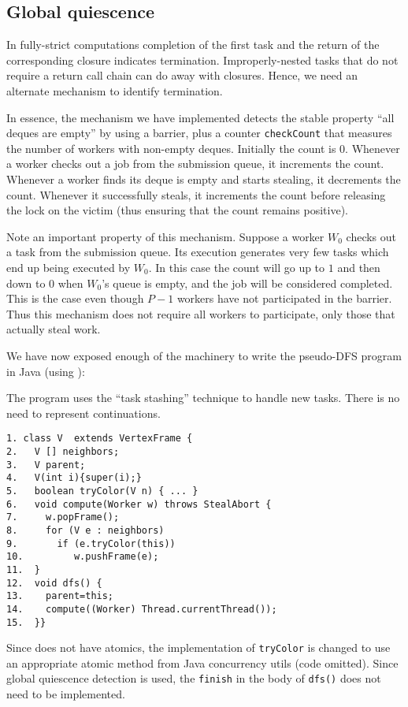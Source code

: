 \subsection{Global quiescence}

In fully-strict computations completion of the first task and the
return of the corresponding closure indicates termination. 
Improperly-nested tasks that do not require a return call
chain can do away with closures. Hence, we need an alternate
mechanism to identify termination. 

In essence, the mechanism we have implemented detects the stable
property ``all deques are empty'' by using a barrier, plus a counter
{\tt checkCount} that measures the number of workers with non-empty
deques.  Initially the count is $0$. Whenever a worker checks out a
job from the submission queue, it increments the count. Whenever a
worker finds its deque is empty and starts stealing, it decrements the
count. Whenever it successfully steals, it increments the count before
releasing the lock on the victim (thus ensuring that the count remains
positive).

Note an important property of this mechanism. Suppose a worker $W_0$
checks out a task from the submission queue. Its execution generates
very few tasks which end up being executed by $W_0$. In this case the
count will go up to $1$ and then down to $0$ when $W_0$'s queue is
empty, and the job will be considered completed. This is the case even
though $P-1$ workers have not participated in the barrier. Thus this
mechanism does not require all workers to participate, only those that
actually steal work.

We have now exposed enough of the \XWS{} machinery to write the
pseudo-DFS program in Java (using \XWS):
\begin{example} \label{example:dfs-xws}
The program uses the ``task stashing'' technique to handle new
tasks. There is no need to represent continuations.
{\footnotesize
\begin{verbatim}
1. class V  extends VertexFrame {
2.   V [] neighbors;
3.   V parent;
4.   V(int i){super(i);}
5.   boolean tryColor(V n) { ... }
6.   void compute(Worker w) throws StealAbort {
7.     w.popFrame();
8.     for (V e : neighbors) 
9.       if (e.tryColor(this)) 
10.         w.pushFrame(e);
11.  }
12.  void dfs() {
13.    parent=this;   
14.    compute((Worker) Thread.currentThread());
15.  }}
\end{verbatim}}
Since \Java{} does not have atomics, the implementation of {\tt tryColor}
is changed to use an appropriate atomic method from Java concurrency utils (code omitted). 
Since global quiescence detection is used, the {\tt finish} 
in the body of {\tt dfs()} does not need to be implemented.
\end{example}


